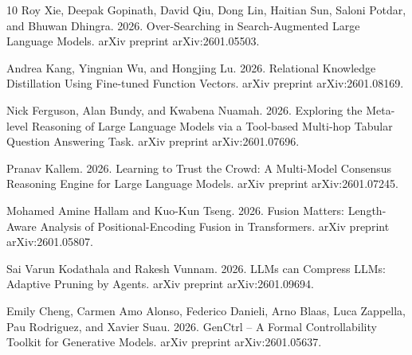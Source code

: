 \documentclass{article}
\begin{document}
\begin{thebibliography}{10}
Roy Xie, Deepak Gopinath, David Qiu, Dong Lin, Haitian Sun, Saloni Potdar, and Bhuwan Dhingra. 2026. Over-Searching in Search-Augmented Large Language Models. arXiv preprint arXiv:2601.05503.

Andrea Kang, Yingnian Wu, and Hongjing Lu. 2026. Relational Knowledge Distillation Using Fine-tuned Function Vectors. arXiv preprint arXiv:2601.08169.

Nick Ferguson, Alan Bundy, and Kwabena Nuamah. 2026. Exploring the Meta-level Reasoning of Large Language Models via a Tool-based Multi-hop Tabular Question Answering Task. arXiv preprint arXiv:2601.07696.

Pranav Kallem. 2026. Learning to Trust the Crowd: A Multi-Model Consensus Reasoning Engine for Large Language Models. arXiv preprint arXiv:2601.07245.

Mohamed Amine Hallam and Kuo-Kun Tseng. 2026. Fusion Matters: Length-Aware Analysis of Positional-Encoding Fusion in Transformers. arXiv preprint arXiv:2601.05807.

Sai Varun Kodathala and Rakesh Vunnam. 2026. LLMs can Compress LLMs: Adaptive Pruning by Agents. arXiv preprint arXiv:2601.09694.

Emily Cheng, Carmen Amo Alonso, Federico Danieli, Arno Blaas, Luca Zappella, Pau Rodriguez, and Xavier Suau. 2026. GenCtrl -- A Formal Controllability Toolkit for Generative Models. arXiv preprint arXiv:2601.05637.

\end{thebibliography}
\end{document}
